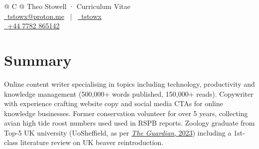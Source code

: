 \documentclass[a4paper,12pt]{article}
\begin{document}
\pagestyle{empty} 



\begin{tabularx}{\linewidth}{@{} C @{}}
\Huge{Theo Stowell · Curriculum Vitae} \\[7.5pt]
\href{mailto:tstowx@proton.me}{\raisebox{-0.05\height}\faEnvelope \ tstowx@proton.me} \ $|$ \
\href{https://linkedin.com/in/tstowx}{\raisebox{-0.05\height}\faLinkedin\ tstowx} \\ 
\href{tel:+447782865142}{\raisebox{-0.05\height}{\faMobile*} \ +44 7782 865142} \\
\end{tabularx}


\section{Summary}
Online content writer specialising in topics including technology, productivity and knowledge management (500,000+ words published, 150,000+ reads). Copywriter with experience crafting website copy and social media CTAs for online knowledge businesses. Former conservation volunteer for over 5 years, collecting avian high tide roost numbers used used in RSPB reports. Zoology graduate from Top-5 UK university (UoSheffield, as per \href{https://www.theguardian.com/education/ng-interactive/2022/sep/24/the-guardian-university-guide-2023-the-rankings}{\textit{The Guardian}, 2023}) including a 1st-class literature review on UK beaver reintroduction.

\end{document}
